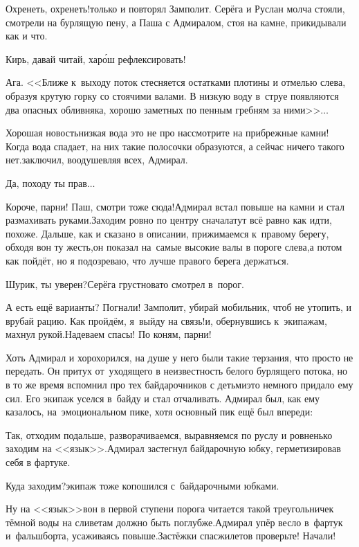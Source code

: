 \diagdash Охренеть, охренеть!\mdash только и повторял Замполит. Серёга и Руслан молча стояли, смотрели на бурлящую пену, а Паша с Адмиралом, стоя на камне, прикидывали как и что.

\diagdash Кирь, давай читай, хар{\'о}ш рефлексировать!

\diagdash Ага. <<Ближе к~выходу поток стесняется остатками плотины и отмелью слева, образуя крутую горку со стоячими валами. В низкую воду в~струе появляются два опасных обливняка, хорошо заметных по пенным гребням за ними>>$\ldots$

\diagdash Хорошая новость\mdash низкая вода это не про нас\mdash смотрите на прибрежные камни! Когда вода спадает, на них такие полосочки образуются, а сейчас ничего такого нет.\mdash заключил, воодушевляя всех, Адмирал.

\diagdash Да, походу ты прав$\ldots$

\diagdash Короче, парни! Паш, смотри тоже сюда!\mdash Адмирал встал повыше на камни и стал размахивать руками.\mdash Заходим ровно по центру сначала\mdash тут всё равно как идти, похоже. Дальше, как и сказано в описании, прижимаемся к~правому берегу, обходя вон ту жесть,\mdash он показал на~самые высокие валы в пороге слева,\mdash а потом как пойдёт, но я подозреваю, что лучше правого берега держаться.

\diagdash Шурик, ты уверен?\mdash Серёга грустновато смотрел в~порог.

\diagdash А есть ещё варианты? Погнали! Замполит, убирай мобильник, чтоб не утопить, и врубай рацию. Как пройдём, я~выйду на связь!\mdash и, обернувшись к~экипажам, махнул рукой.\mdash Надеваем спасы! По коням, парни!

Хоть Адмирал и хорохорился, на душе у него были такие терзания, что просто не передать. Он притух от~уходящего в неизвестность белого бурлящего потока, но в то же время вспомнил про тех байдарочников с детьми\mdash это немного придало ему сил. Его экипаж уселся в~байду и стал отчаливать. Адмирал был, как ему казалось, на~эмоциональном пике, хотя основный пик ещё был впереди:

\diagdash Так, отходим подальше, разворачиваемся, выравняемся по руслу и ровненько заходим на <<язык>>.\mdash Адмирал застегнул байдарочную юбку, герметизировав себя в фартуке.

\diagdash Куда заходим?\mdash экипаж тоже копошился с~байдарочными юбками.

\diagdash Ну на <<язык>>\mdash вон в первой ступени порога читается такой треугольничек тёмной воды на сливе\mdash там должно быть поглубже.\mdash Адмирал упёр весло в~фартук и~фальшборта, усаживаясь повыше.\mdash Застёжки спасжилетов проверьте! Начали!

